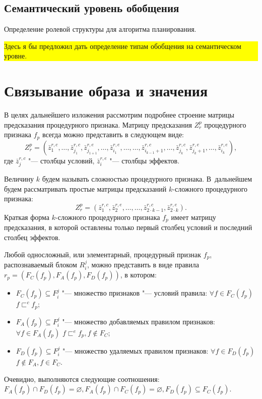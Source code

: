 \documentclass[a4paper, 12pt]{article}
\theoremstyle{plain}
\begin{document}
	\subsection{Семантический уровень обобщения} Определение ролевой структуры для алгоритма планирования.
	
	\noindent\colorbox{yellow}{
		\parbox{\dimexpr\linewidth-2\fboxsep}{Здесь я бы предложил дать определение типам обобщения на семантическом уровне.}
	}
	
	\section{Связывание образа и значения}
		В целях дальнейшего изложения рассмотрим подробнее строение матрицы предсказания процедурного признака. Матрицу предсказания $Z_r^p$ процедурного признака $f_p$ всегда можно представить в следующем виде:
		\begin{equation}
		Z_r^p=(\bar z_1^{r,c},\dots,\bar z_{j_1}^{r,c},\bar z_{j_{1+1}}^{r,e},\dots,\bar z_{i_1}^{r,e},\dots,\dots,\bar z_{i_{k-1}+1}^{r,c},\dots,\bar z_{j_k}^{r,c},\bar z_{j_k+1}^{r,e},\dots,\bar z_{i_k}^{r,e}),
		\end{equation}
		где $\bar z_j^{r,c}$ "--- столбцы условий, $\bar z_i^{r,e}$ "--- столбцы эффектов. 
		
		Величину $k$ будем называть сложностью процедурного признака. В~дальнейшем будем рассматривать простые матрицы предсказаний $k$-сложного процедурного признака:
		\begin{equation}
		Z_r^p=(\bar z_1^{r,c},\bar z_2^{r,e},\dots,\dots,\bar z_{2\cdot k-1}^{r,c},\bar z_{2\cdot k}^{r,e}).
		\end{equation}
		Краткая форма $k$-сложного процедурного признака $f_p$ имеет матрицу предсказания, в которой оставлены только первый столбец условий и последний столбец эффектов.
		
		Любой односложный, или элементарный, процедурный признак $f_p$, распознаваемый блоком $R_i^j$, можно представить в виде правила $r_p=(F_C(f_p),F_A(f_p),F_D(f_p))$, в котором:
		\begin{itemize}
			\item $F_C (f_p )\subseteq F_i^j$ "--- множество признаков "--- условий правила: $\forall f\in F_C(f_p)$ $f\sqsubset^c f_p$;
			\item $F_A(f_p)\subseteq F_i^j$ "--- множество добавляемых правилом признаков: $\forall f\in F_A(f_p)$ $f\sqsubset^e f_p,f\notin F_C$;
			\item $F_D(f_p)\subseteq F_i^j$ "--- множество удаляемых правилом признаков: $\forall f\in F_D(f_p)$ $f\notin F_A,f\in F_C$.
		\end{itemize}
		Очевидно, выполняются следующие соотношения: $F_A(f_p)\cap F_D(f_p)=\varnothing, F_A(f_p)\cap F_C(f_p)=\varnothing, F_D(f_p)\subseteq F_C(f_p)$.
		
\end{document}
